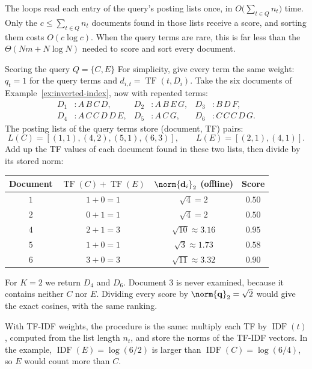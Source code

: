 \documentclass[a4paper,12pt,oneside]{report}
\begin{document}
The loops read each entry of the query's posting lists once, in
$O\bigl(\sum_{t\in Q}n_t\bigr)$ time. Only the $c\leq\sum_{t\in Q}n_t$
documents found in those lists receive a score, and sorting them
costs $O(c\log c)$. When the query terms are rare, this is far less
than the $\Theta(Nm+N\log N)$ needed to score and sort every document.

\begin{framedexample}{Scoring the query $Q=\{C,E\}$}\label{ex:ranked-index}
For simplicity, give every term the same weight: $q_t=1$ for the query
terms and $d_{i,t}=\operatorname{TF}(t,D_i)$. Take the six documents of
Example~\ref{ex:inverted-index}, now with repeated terms:
\[
\begin{aligned}
  D_1&:A\,B\,C\,D, & D_2&:A\,B\,E\,G, & D_3&:B\,D\,F,\\
  D_4&:A\,C\,C\,D\,D\,E, & D_5&:A\,C\,G, & D_6&:C\,C\,C\,D\,G.
\end{aligned}
\]
The posting lists of the query terms store (document, TF) pairs:
\[
  L(C)=[(1,1),(4,2),(5,1),(6,3)],\qquad L(E)=[(2,1),(4,1)].
\]
Add up the TF values of each document found in these two lists, then
divide by its stored norm:
\begin{center}
\begin{tabular}{c|c|c|c}
  Document & $\operatorname{TF}(C)+\operatorname{TF}(E)$
    & $\norm{\mathbf d_i}_2$ (offline) & Score\\\hline
  $1$ & $1+0=1$ & $\sqrt4=2$ & $0.50$\\
  $2$ & $0+1=1$ & $\sqrt4=2$ & $0.50$\\
  $4$ & $2+1=3$ & $\sqrt{10}\approx3.16$ & $\mathbf{0.95}$\\
  $5$ & $1+0=1$ & $\sqrt3\approx1.73$ & $0.58$\\
  $6$ & $3+0=3$ & $\sqrt{11}\approx3.32$ & $\mathbf{0.90}$
\end{tabular}
\end{center}
For $K=2$ we return $D_4$ and $D_6$. Document $3$ is never examined,
because it contains neither $C$ nor $E$. Dividing every score by
$\norm{\mathbf q}_2=\sqrt2$ would give the exact cosines, with the same
ranking.
\end{framedexample}

With TF-IDF weights, the procedure is the same: multiply each TF by
$\operatorname{IDF}(t)$, computed from the list length $n_t$, and store
the norms of the TF-IDF vectors. In the example,
$\operatorname{IDF}(E)=\log(6/2)$ is larger than
$\operatorname{IDF}(C)=\log(6/4)$, so $E$ would count more than $C$.
\end{document}
